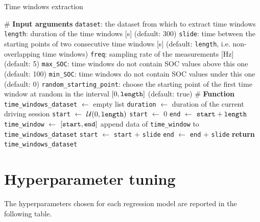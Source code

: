 \begin{algorithm}
\caption{Time windows extraction}
\label{alg:time_window_extraction}
\begin{algorithmic}[1]
\State \# \textbf{Input arguments}
\State \texttt{dataset}: the dataset from which to extract time windows
\State \texttt{length}: duration of the time windows [s] (default: 300)
\State \texttt{slide}: time between the starting points of two consecutive time windows [s] (default: \texttt{length}, i.e. non-overlapping time windows)
\State \texttt{freq}: sampling rate of the measurements [Hz] (default: 5)
\State \texttt{max\_SOC}: time windows do not contain SOC values above this one (default: 100)
\State \texttt{min\_SOC}: time windows do not contain SOC values under this one (default: 0)
\State \texttt{random\_starting\_point}: choose the starting point of the first time window at random in the interval $[0,\text{\texttt{length}}]$ (default: true)
\State 
\State \# \textbf{Function}
\State \texttt{time\_windows\_dataset} $\gets$ empty list
\State \texttt{duration} $\gets$ duration of the current driving session
        \State \texttt{start} $\gets$ $\mathcal{U}(0,\text{\texttt{length}})$
    \Else
        \State \texttt{start} $\gets$ 0
    \EndIf
    \State \texttt{end} $\gets$ $\text{\texttt{start}} + \text{\texttt{length}}$
        \State \texttt{time\_window} $\gets$ $[\text{\texttt{start}},\text{\texttt{end}}]$
            \State append data of \texttt{time\_window} to \texttt{time\_windows\_dataset}
        \EndIf
        \State \texttt{start} $\gets$ \texttt{start} $+$ \texttt{slide}
        \State \texttt{end} $\gets$ \texttt{end} $+$ \texttt{slide}
    \EndWhile
\EndFor
\State \textbf{return} \texttt{time\_windows\_dataset}
\end{algorithmic}
\end{algorithm}



\section{Hyperparameter tuning}
\label{sec:hyperparameter tuning}
The hyperparameters chosen for each regression model are reported in the following table.

